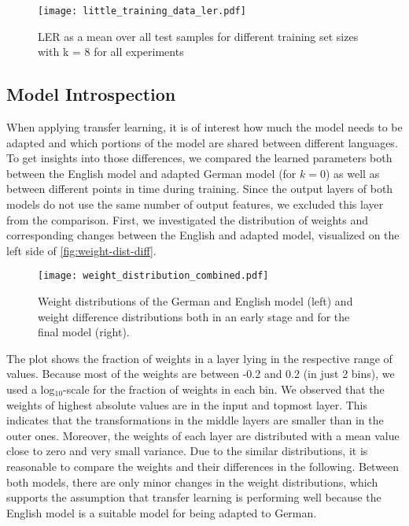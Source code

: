 \documentclass[11pt,a4paper]{article}
\begin{document}
\begin{figure}[th]
  \texttt{[image: little\_training\_data\_ler.pdf]}
  \caption{\ac{LER} as a mean over all test samples for different training set sizes with k = 8 for all experiments}
  \label{fig:less-data}
\end{figure}

\subsection{Model Introspection}

When applying transfer learning, it is of interest how much the model needs to be adapted and which portions of the model are shared between different languages.
To get insights into those differences, we compared the learned parameters both between the English model and adapted German model (for $k=0$) as well as between different points in time during training.
Since the output layers of both models do not use the same number of output features, we excluded this layer from the comparison.
First, we investigated the distribution of weights and corresponding changes between the English and adapted model, visualized on the left side of \autoref{fig:weight-dist-diff}.
\begin{figure*}[th!]
  \texttt{[image: weight\_distribution\_combined.pdf]}
  \caption{Weight distributions of the German and English model (left) and weight difference distributions both in an early stage and for the final model (right).}
  \label{fig:weight-dist-diff}
\end{figure*}
The plot shows the fraction of weights in a layer lying in the respective range of values.
Because most of the weights are between -0.2 and 0.2 (in just 2 bins), we used a log$_{10}$-scale for the fraction of weights in each bin.
We observed that the weights of highest absolute values are in the input and topmost layer.
This indicates that the transformations in the middle layers are smaller than in the outer ones.
Moreover, the weights of each layer are distributed with a mean value close to zero and very small variance.
Due to the similar distributions, it is reasonable to compare the weights and their differences in the following.
Between both models, there are only minor changes in the weight distributions, which supports the assumption that transfer learning is performing well because the English model is a suitable model for being adapted to German.
\end{document}
